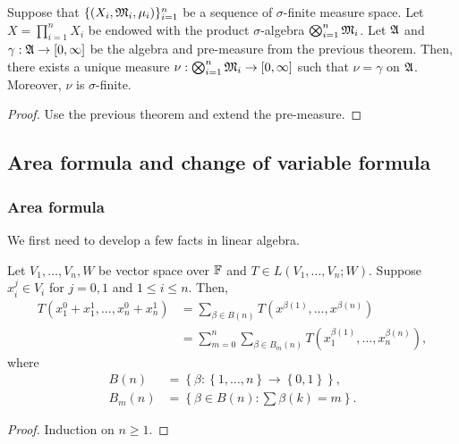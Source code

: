 \documentclass[a4paper]{article}
\begin{document}
\begin{cor}
  Suppose that $\{(X_i, \mathfrak{M}_i, \mu_i)\}_{i=1}^n$ be
  a sequence of $\sigma$-finite measure space.
  Let $X = \prod_{i=1}^n X_i$ be endowed with the product
  $\sigma$-algebra $\bigotimes_{i=1}^n \mathfrak{M}_i$. Let $\mathfrak{A}$
  and $\gamma: \mathfrak{A} \to [0, \infty]$ be the algebra and
  pre-measure from the previous theorem. Then, there
  exists a unique measure $\nu: \bigotimes_{i=1}^n \mathfrak{M}_i
    \to [0, \infty]$ such that $\nu = \gamma$ on $\mathfrak{A}$.
  Moreover, $\nu$ is $\sigma$-finite.
\end{cor}

\begin{proof}
  Use the previous theorem and extend the pre-measure.
\end{proof}

\subsection{Area formula and change of variable formula}

\subsubsection{Area formula}

We first need to develop a few facts in linear algebra.

\begin{prop}
  Let $V_1, \dots, V_n, W$ be vector space over $\mathbb{F}$ and $T \in L(V_1,
    \dots, V_n ; W)$. Suppose $x_i^j \in V_i$ for $j = 0, 1$ and $1 \leq i
    \leq n$. Then,
  \[
    \begin{aligned}
      T(x^0_1 + x^1_1, \dots, x^0_n + x^1_n)
       & = \sum_{\beta \in B(n)}
      T(x^{\beta(1)}, \dots, x^{\beta(n)})      \\
       & = \sum_{m=0}^n \sum_{\beta \in B_m(n)}
      T(x_1^{\beta(1)}, \dots, x_n^{\beta(n)}),
    \end{aligned}
  \]
  where
  \[
    \begin{aligned}
      B(n)   & = \left\{ \beta : \left\{ 1, \dots, n \right\}
      \to \left\{ 0, 1 \right\} \right\},                     \\
      B_m(n) & = \left\{ \beta \in B(n) :
      \sum \beta(k) = m \right\}.
    \end{aligned}
  \]
\end{prop}

\begin{proof}
  Induction on $n \geq 1$.
\end{proof}
\end{document}
